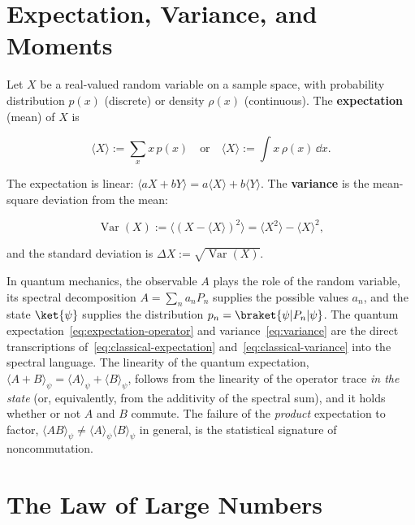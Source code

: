 \section{Expectation, Variance, and Moments}
\label{sec:expectation-variance}

Let $X$ be a real-valued random variable on a sample space, with probability distribution $p(x)$ (discrete) or density $\rho(x)$ (continuous). The \textbf{expectation} (mean) of $X$ is
\begin{linenomath}
    \begin{equation}
        \langle X \rangle := \sum_x x\,p(x) \quad \text{or} \quad \langle X \rangle := \int x\,\rho(x)\,\dd x.
        \label{eq:classical-expectation}
    \end{equation}
\end{linenomath}
The expectation is linear: $\langle aX + bY \rangle = a\langle X \rangle + b\langle Y \rangle$. The \textbf{variance} is the mean-square deviation from the mean:
\begin{linenomath}
    \begin{equation}
        \operatorname{Var}(X) := \langle (X - \langle X \rangle)^2 \rangle = \langle X^2 \rangle - \langle X \rangle^2,
        \label{eq:classical-variance}
    \end{equation}
\end{linenomath}
and the standard deviation is $\Delta X := \sqrt{\operatorname{Var}(X)}$.

In quantum mechanics, the observable $A$ plays the role of the random variable, its spectral decomposition $A = \sum_n a_n P_n$ supplies the possible values $a_n$, and the state $\ket{\psi}$ supplies the distribution $p_n = \braket{\psi|P_n|\psi}$. The quantum expectation~\eqref{eq:expectation-operator} and variance~\eqref{eq:variance} are the direct transcriptions of~\eqref{eq:classical-expectation} and~\eqref{eq:classical-variance} into the spectral language. The linearity of the quantum expectation, $\langle A + B \rangle_\psi = \langle A \rangle_\psi + \langle B \rangle_\psi$, follows from the linearity of the operator trace \emph{in the state} (or, equivalently, from the additivity of the spectral sum), and it holds whether or not $A$ and $B$ commute. The failure of the \emph{product} expectation to factor, $\langle AB \rangle_\psi \neq \langle A \rangle_\psi \langle B \rangle_\psi$ in general, is the statistical signature of noncommutation.

\section{The Law of Large Numbers}
\label{sec:law-of-large-numbers}

